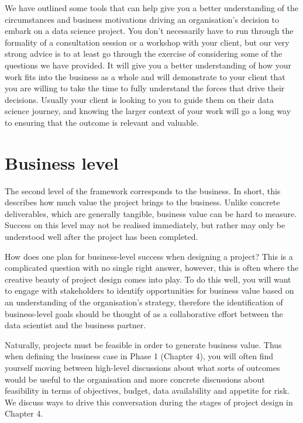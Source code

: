 \documentclass[
]{book}
\begin{document}
We have outlined some tools that can help give you a better understanding of the circumstances and business motivations driving an organisation's decision to embark on a data science project. You don't necessarily have to run through the formality of a consultation session or a workshop with your client, but our very strong advice is to at least go through the exercise of considering some of the questions we have provided. It will give you a better understanding of how your work fits into the business as a whole and will demonstrate to your client that you are willing to take the time to fully understand the forces that drive their decisions. Usually your client is looking to you to guide them on their data science journey, and knowing the larger context of your work will go a long way to ensuring that the outcome is relevant and valuable.

\hypertarget{business-level}{%
\section{Business level}\label{business-level}}

The second level of the framework corresponds to the business. In short, this describes how much value the project brings to the business. Unlike concrete deliverables, which are generally tangible, business value can be hard to measure. Success on this level may not be realised immediately, but rather may only be understood well after the project has been completed.

How does one plan for business-level success when designing a project? This is a complicated question with no single right answer, however, this is often where the creative beauty of project design comes into play. To do this well, you will want to engage with stakeholders to identify opportunities for business value based on an understanding of the organisation's strategy, therefore the identification of business-level goals should be thought of as a collaborative effort between the data scientist and the business partner.

Naturally, projects must be feasible in order to generate business value. Thus when defining the business case in Phase 1 (Chapter 4), you will often find yourself moving between high-level discussions about what sorts of outcomes would be useful to the organisation and more concrete discussions about feasibility in terms of objectives, budget, data availability and appetite for risk. We discuss ways to drive this conversation during the stages of project design in Chapter 4.
\end{document}
